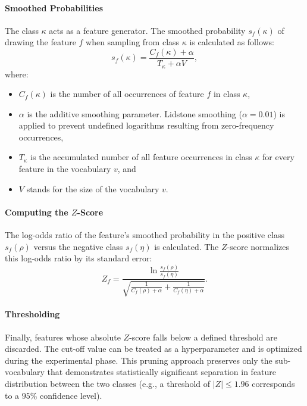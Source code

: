 \documentclass[a4paper,fleqn]{cas-dc}
\newcommand{\zscore}{Z}
\newcommand{\positive}{\rho}
\newcommand{\negative}{\eta}
\newcommand{\smoothedprob}[2]{s_{#1}(#2)}
\newcommand{\Count}[2]{C_{#1}(#2)}
\newcommand{\vocab}{v}
\newcommand{\vocabsize}{V}
\newcommand{\feature}{f}
\newcommand{\tokenclass}{\kappa}
\newcommand{\numbertokens}[1]{T_{#1}}
\newcommand{\smoothparam}{\alpha}
\begin{document}
\paragraph{Smoothed Probabilities}

The class $\tokenclass$ acts as a feature generator. The smoothed probability $\smoothedprob{\feature}{\tokenclass}$ of drawing the feature $\feature$ when sampling from class $\tokenclass$ is calculated as follows:
\begin{equation}
	\smoothedprob{\feature}{\tokenclass} = \frac{\Count{\feature}{\tokenclass} + \smoothparam}{\numbertokens{\tokenclass} + \smoothparam \vocabsize},
\end{equation}
where:
\begin{itemize}
	\item $\Count{\feature}{\tokenclass}$ is the number of all occurrences of feature $\feature$ in class $\tokenclass$,
	\item $\smoothparam$ is the additive smoothing parameter. Lidstone smoothing ($\smoothparam=0.01$) is applied to prevent undefined logarithms resulting from zero-frequency occurrences,
	\item $\numbertokens{\tokenclass}$ is the accumulated number of all feature occurrences in class $\tokenclass$ for every feature in the vocabulary $\vocab$, and
	\item $\vocabsize$ stands for the size of the vocabulary $\vocab$.
\end{itemize}

\paragraph{Computing the ${\zscore}$-Score}
The log-odds ratio of the feature's smoothed probability in the positive class $\smoothedprob{\feature}{\positive}$ versus the negative class $\smoothedprob{\feature}{\negative}$ is calculated. The $\zscore$-score normalizes this log-odds ratio by its standard error:
\begin{equation}
	\zscore_\feature = \frac{\ln\frac{\smoothedprob{\feature}{\positive}}{\smoothedprob{\feature}{\negative}}}{\sqrt{\frac{1}{\Count{\feature}{\positive} + \smoothparam} + \frac{1}{\Count{\feature}{\negative} + \smoothparam}}}.
	\label{eq:zscore}
\end{equation}

\paragraph{Thresholding}
Finally, features whose absolute $\zscore$-score falls below a defined threshold are discarded. The cut-off value can be treated as a hyperparameter and is optimized during the experimental phase. This pruning approach preserves only the sub-vocabulary that demonstrates statistically significant separation in feature distribution between the two classes (e.g., a threshold of $|\zscore| \le 1.96$ corresponds to a $95\%$ confidence level). 
\end{document}
